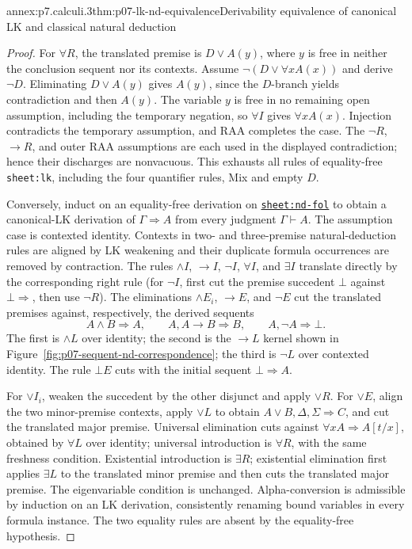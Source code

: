 \begin{annexitem}{annex:p7.calculi.3}{thm:p07-lk-nd-equivalence}{Derivability equivalence of canonical LK and classical natural deduction}
\begin{proof}
For \(\forall R\), the translated premise is \(D\lor A(y)\), where \(y\) is
free in neither the conclusion sequent nor its contexts.  Assume
\(\neg(D\lor\forall xA(x))\) and derive \(\neg D\).  Eliminating
\(D\lor A(y)\) gives \(A(y)\), since the \(D\)-branch yields contradiction
and then \(A(y)\).  The variable \(y\) is free in no remaining open assumption,
including the temporary negation, so \(\forall I\) gives \(\forall xA(x)\).
Injection contradicts the temporary assumption, and RAA completes the case.
The \(\neg R\), \(\to R\), and outer RAA assumptions are each used in the
displayed contradiction; hence their discharges are nonvacuous.  This exhausts
all rules of equality-free \texttt{sheet:lk}, including the four quantifier
rules, Mix and empty \(D\).

Conversely, induct on an equality-free derivation on
\hyperref[sheet:nd-fol]{\texttt{sheet:nd-fol}} to obtain a canonical-LK
derivation of \(\Gamma\Rightarrow A\) from every judgment
\(\Gamma\vdash A\).  The assumption case is contexted identity.  Contexts in
two- and three-premise natural-deduction rules are aligned by LK weakening and
their duplicate formula occurrences are removed by contraction.
The rules \(\land I\), \(\to I\), \(\neg I\), \(\forall I\), and
\(\exists I\) translate directly by the corresponding right rule (for
\(\neg I\), first cut the premise succedent \(\bot\) against
\(\bot\Rightarrow\), then use \(\neg R\)).  The eliminations
\(\land E_i\), \(\to E\), and \(\neg E\) cut the translated premises against,
respectively, the derived sequents
\[
 A\land B\Rightarrow A,\qquad
 A,A\to B\Rightarrow B,
 \qquad
 A,\neg A\Rightarrow\bot.
\]
The first is \(\land L\) over identity; the second is the \(\to L\) kernel
shown in Figure~\ref{fig:p07-sequent-nd-correspondence}; the third is
\(\neg L\) over contexted identity.  The rule \(\bot E\) cuts with the
initial sequent \(\bot\Rightarrow A\).

For \(\lor I_i\), weaken the succedent by the other disjunct and apply
\(\lor R\).  For \(\lor E\), align the two minor-premise contexts, apply
\(\lor L\) to obtain \(A\lor B,\Delta,\Sigma\Rightarrow C\), and cut the
translated major premise.  Universal elimination cuts against
\(\forall xA\Rightarrow A[t/x]\), obtained by \(\forall L\) over identity;
universal introduction is \(\forall R\), with the same freshness condition.
Existential introduction is \(\exists R\); existential elimination first
applies \(\exists L\) to the translated minor premise and then cuts the
translated major premise.  The eigenvariable condition is unchanged.
Alpha-conversion is admissible by induction on an LK derivation, consistently
renaming bound variables in every formula instance.  The two equality rules
are absent by the equality-free hypothesis.


\end{proof}
\end{annexitem}
